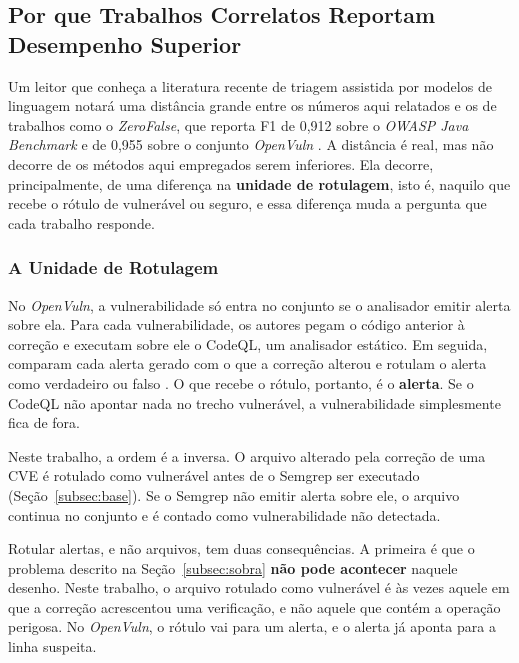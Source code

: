\subsection{Por que Trabalhos Correlatos Reportam Desempenho Superior}
\label{subsec:porquemelhor}

Um leitor que conheça a literatura recente de triagem assistida por modelos de linguagem notará uma distância grande entre os números aqui relatados e os de trabalhos como o \textit{ZeroFalse}, que reporta F1 de 0,912 sobre o \textit{OWASP Java Benchmark} e de 0,955 sobre o conjunto \textit{OpenVuln} \cite{iranmanesh2025zerofalseimprovingprecisionstatic}. A distância é real, mas não decorre de os métodos aqui empregados serem inferiores. Ela decorre, principalmente, de uma diferença na \textbf{unidade de rotulagem}, isto é, naquilo que recebe o rótulo de vulnerável ou seguro, e essa diferença muda a pergunta que cada trabalho responde.

\subsubsection{A Unidade de Rotulagem}

No \textit{OpenVuln}, a vulnerabilidade só entra no conjunto se o analisador emitir alerta sobre ela. Para cada vulnerabilidade, os autores pegam o código anterior à correção e executam sobre ele o CodeQL, um analisador estático. Em seguida, comparam cada alerta gerado com o que a correção alterou e rotulam o alerta como verdadeiro ou falso \cite{iranmanesh2025zerofalseimprovingprecisionstatic}. O que recebe o rótulo, portanto, é o \textbf{alerta}. Se o CodeQL não apontar nada no trecho vulnerável, a vulnerabilidade simplesmente fica de fora.

Neste trabalho, a ordem é a inversa. O arquivo alterado pela correção de uma CVE é rotulado como vulnerável antes de o Semgrep ser executado (Seção~\ref{subsec:base}). Se o Semgrep não emitir alerta sobre ele, o arquivo continua no conjunto e é contado como vulnerabilidade não detectada.

Rotular alertas, e não arquivos, tem duas consequências. A primeira é que o problema descrito na Seção~\ref{subsec:sobra} \textbf{não pode acontecer} naquele desenho. Neste trabalho, o arquivo rotulado como vulnerável é às vezes aquele em que a correção acrescentou uma verificação, e não aquele que contém a operação perigosa. No \textit{OpenVuln}, o rótulo vai para um alerta, e o alerta já aponta para a linha suspeita.

